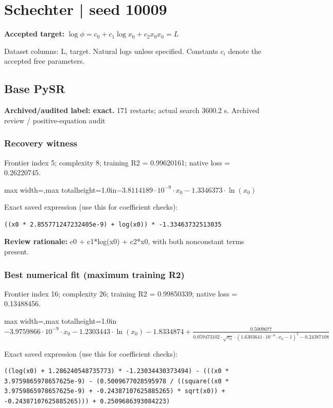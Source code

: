 \documentclass[10pt,letterpaper,landscape]{article}
\begin{document}
\section*{Schechter | seed 10009}
\textbf{Accepted target:} $\displaystyle \log\phi=c_0+c_1\log x_0+c_2x_0$\hfill $x_0=L$\par
{\small Dataset columns: L, target. Natural logs unless specified. Constants $c_i$ denote the accepted free parameters.}\par\medskip
\begin{minipage}[t]{0.485\textwidth}
\subsection*{Base PySR}
\textbf{Archived/audited label: exact.} 171 restarts; actual search 3600.2 s.
{\small Archived review / positive-equation audit}
\subsubsection*{Recovery witness}
Frontier index 5; complexity 8; training R2 = 0.99620161; native loss = 0.26220745.
\begin{center}\begin{adjustbox}{max width=\linewidth,max totalheight=1.0in}$\displaystyle - 3.8114189 \cdot 10^{-9} \cdot x_{0} - 1.3346373 \cdot \ln{\left(x_{0} \right)}$\end{adjustbox}\end{center}
{\scriptsize Exact saved expression (use this for coefficient checks):}
\begin{lstlisting}
((x0 * 2.855771247232405e-9) + log(x0)) * -1.33463732513035
\end{lstlisting}
{\small\textbf{Review rationale:} c0 + c1*log(x0) + c2*x0, with both nonconstant terms present.}
\subsubsection*{Best numerical fit (maximum training R2)}
Frontier index 16; complexity 26; training R2 = 0.99850339; native loss = 0.13488456.
\begin{center}\begin{adjustbox}{max width=\linewidth,max totalheight=1.0in}$\displaystyle - 3.9759866 \cdot 10^{-9} \cdot x_{0} - 1.2303443 \cdot \ln{\left(x_{0} \right)} - 1.8334874 + \frac{0.5009677}{0.059473102 \cdot \sqrt{x_{0}} \cdot \left(1.6303641 \cdot 10^{-8} \cdot x_{0} - 1\right)^{2} - 0.24387108}$\end{adjustbox}\end{center}
{\scriptsize Exact saved expression (use this for coefficient checks):}
\begin{lstlisting}
((log(x0) + 1.286240548735773) * -1.23034430373494) - (((x0 * 3.9759865978657625e-9) - (0.5009677028595978 / ((square((x0 * 3.9759865978657625e-9) + -0.24387107625885265) * sqrt(x0)) + -0.24387107625885265))) + 0.2509686393084223)
\end{lstlisting}
\end{minipage}\hfill
\end{document}
